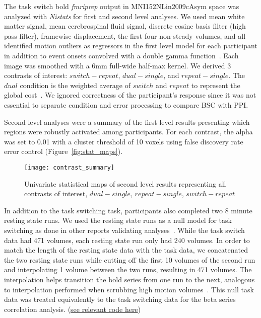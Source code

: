 \documentclass[phd,appendix,figures]{uithesis}
\begin{document}
The task switch bold \emph{fmriprep} output in MNI152NLin2009cAsym space
was analyzed with \emph{Nistats} for first and second level analyses.
We used mean white matter signal, mean cerebrospinal fluid signal,
discrete cosine basis filter (high pass filter), framewise displacement, the first four non-steady volumes, and
all identified motion outliers as regressors in the first level model for each participant
in addition to event onsets convolved with a double gamma function~\cite{Glover1999}.
Each image was smoothed with a 6mm full-wide half-max kernel.
We derived 3 contrasts of interest: $switch - repeat$, $dual- single$, and $repeat - single$.
The $dual$ condition is the weighted average of $switch$ and $repeat$ to represent the global cost~\cite{Wylie2000}.
We ignored correctness of the participant's response since it was not essential to
separate condition and error processing to compare BSC with PPI.

Second level analyses were a summary of the first level results presenting which
regions were robustly activated among participants.
For each contrast, the alpha was set to 0.01 with a cluster threshold of 10 voxels using
false discovery rate error control (Figure~\ref{fig:stat_maps}).

\begin{figure}[H]
  \centering
  \texttt{[image: contrast\_summary]}
  \caption{
    Univariate statistical maps of second level results representing
    all contrasts of interest, $dual - single$, $repeat - single$, $switch - repeat$}
  \label{fig:stat_maps2}
\end{figure}

In addition to the task switching task, participants also completed
two 8 minute resting state runs.
We used the resting state runs as a null model for task switching as done
in other reports validating analyses~\cite{Eklund2016,Olszowy2019}.
While the task switch data had 471 volumes, each resting state run only had
240 volumes.
In order to match the length of the resting state data with the task data, we concatenated
the two resting state runs while cutting off the first 10 volumes of the second run
and interpolating 1 volume between the two runs, resulting in 471 volumes.
The interpolation helps transition the bold series from one run to the next,
analogous to interpolation performed when scrubbing high motion volumes~\cite{Power2014a}. 
This null task data was treated equivalently to the task switching data for the
beta series correlation analysis.
(\href{https://github.com/jdkent/validateBetaSeries/tree/195ad5b4201971038dbbf8f73a3c537caf032743}{see relevant code here})
\end{document}
